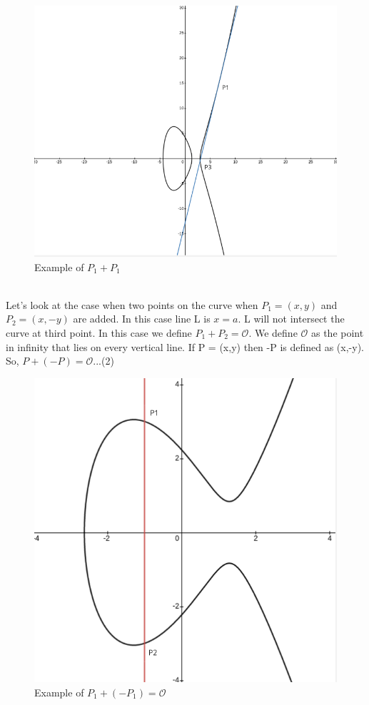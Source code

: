 \documentclass[a4paper,12pt]{report}
\begin{document}
\begin{figure}[h!]
	\caption{Example of $P_1+P_1$}
	\begin{center}
		\includegraphics[scale=0.3]{3}
	\end{center}
\end{figure}
\\Let's look at the case when two points on the curve when $P_1=(x,y)$ and $P_2=(x,-y)$ are added. In this case line L is $x=a$. L will not intersect the curve at third point. In this case we define
$ P_1+P_2= \mathscr{O} $. We define $\mathscr{O}$  as the point in infinity that lies on every vertical line.
If P = (x,y) then -P is defined as (x,-y). So, $P+(-P)=\mathscr{O}$...(2)\\
\begin{figure}[h!]
	\begin{center}
		\caption{Example of $P_1+(-P_1)=\mathscr{O}$}
		\includegraphics[scale=0.3]{1}
	\end{center}
\end{figure}
\end{document}
